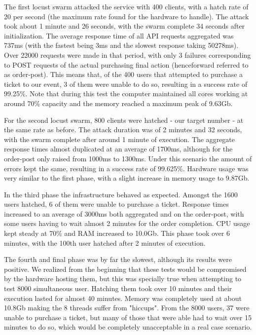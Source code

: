 \documentclass[12pt]{article}
\begin{document}
The first locust swarm attacked the service with 400 clients, with a hatch rate of 20 per second (the maximum rate found for the hardware to handle).
The attack took about 1 minute and 26 seconds, with the swarm complete 34 seconds after initialization.
The average response time of all API requests aggregated was 737ms (with the fastest being 3ms and the slowest response taking 50278ms).
Over 22000 requests were made in that period, with only 3 failures corresponding to POST requests of the actual purchasing final action (henceforward referred
to as order-post).
This means that, of the 400 users that attempted to purchase a ticket to our event, 3 of them were unable to do so, resulting in a success rate of 99.25\%.
Note that during this test the computer maintained all cores working at around 70\% capacity and the memory reached a maximum peak of 9.63Gb.

For the second locust swarm, 800 clients were hatched - our target number - at the same rate as before.
The attack duration was of 2 minutes and 32 seconds, with the swarm complete after around 1 minute of execution.
The aggregate response times almost duplicated at an average of 1700ms, although for the order-post only raised from 1000ms to 1300ms.
Under this scenario the amount of errors kept the same, resulting in a success rate of 99.625\%.
Hardware usage was very similar to the first phase, with a slight increase in memory usage to 9.87Gb.

In the third phase the infrastructure behaved as expected.
Amongst the 1600 users hatched, 6 of them were unable to purchase a ticket.
Response times increased to an average of 3000ms both aggregated and on the order-post, with some users having to wait almost 2 minutes for the order completion.
CPU usage kept steady at 70\% and RAM increased to 10.0Gb.
This phase took over 6 minutes, with the 100th user hatched after 2 minutes of execution.

The fourth and final phase was by far the slowest, although its results were positive.
We realized from the beginning that these tests would be compromised by the hardware hosting them, but this was specially true when attempting to test 8000 
simultaneous user.
Hatching them took over 10 minutes and their execution lasted for almost 40 minutes.
Memory was completely used at about 10.8Gb making the 8 threads suffer from "hiccups".
From the 8000 users, 37 were unable to purchase a ticket, but many of those that were able had to wait over 15 minutes to do so, which would be completely 
unacceptable in a real case scenario.
\end{document}
